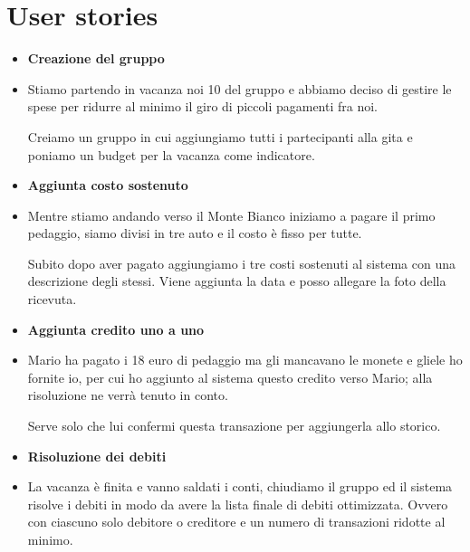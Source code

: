 \documentclass[11pt]{beamer}
\begin{document}
	\section{User stories}
	
	\begin{frame}
		\begin{itemize}
			\item \textbf{Creazione del gruppo}
			
			\item[] Stiamo partendo in vacanza noi 10 del gruppo e abbiamo deciso di gestire le spese per ridurre al minimo il giro di piccoli pagamenti fra noi.
			
			Creiamo un gruppo in cui aggiungiamo tutti i partecipanti alla gita e poniamo un budget per la vacanza come indicatore.
			
			\item \textbf{Aggiunta costo sostenuto}
			
			\item[] Mentre stiamo andando verso il Monte Bianco iniziamo a pagare il primo pedaggio, siamo divisi in tre auto e il costo è fisso per tutte.
			
			Subito dopo aver pagato aggiungiamo i tre costi sostenuti al sistema con una descrizione degli stessi. Viene aggiunta la data e posso allegare la foto della ricevuta.
		\end{itemize}
	\end{frame}

	\begin{frame}
		\begin{itemize}
			\item \textbf{Aggiunta credito uno a uno}
			
			\item[] Mario ha pagato i 18 euro di pedaggio ma gli mancavano le monete e gliele ho fornite io, per cui ho aggiunto al sistema questo credito verso Mario; alla risoluzione ne verrà tenuto in conto.
			
			Serve solo che lui confermi questa transazione per aggiungerla allo storico.
			
			\item \textbf{Risoluzione dei debiti}
			
			\item[] La vacanza è finita e vanno saldati i conti, chiudiamo il gruppo ed il sistema risolve i debiti in modo da avere la lista finale di debiti ottimizzata. Ovvero con ciascuno solo debitore o creditore e un numero di transazioni ridotte al minimo.
		\end{itemize}
	\end{frame}
\end{document}
